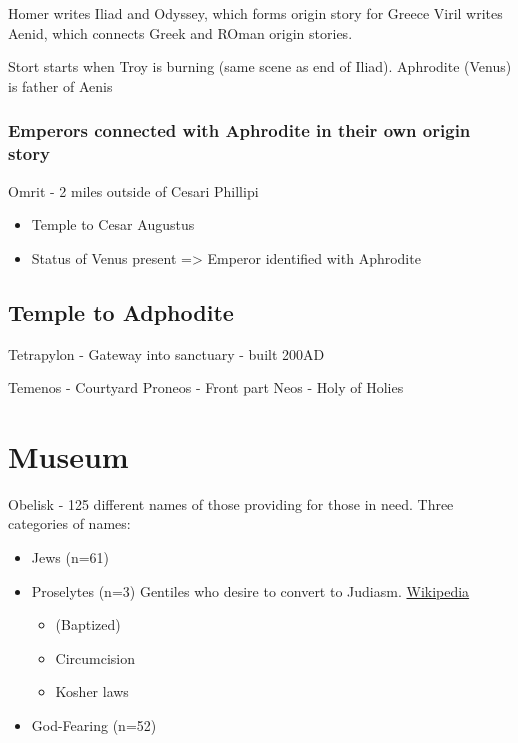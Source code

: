 \documentclass[
]{book}
\providecommand{\tightlist}{%
  \setlength{\itemsep}{0pt}\setlength{\parskip}{0pt}}
\begin{document}
Homer writes Iliad and Odyssey, which forms origin story for Greece
Viril writes Aenid, which connects Greek and ROman origin stories.

Stort starts when Troy is burning (same scene as end of Iliad).
Aphrodite (Venus) is father of Aenis

\hypertarget{emperors-connected-with-aphrodite-in-their-own-origin-story}{%
\subsection{Emperors connected with Aphrodite in their own origin story}\label{emperors-connected-with-aphrodite-in-their-own-origin-story}}

Omrit - 2 miles outside of Cesari Phillipi

\begin{itemize}
\tightlist
\item
  Temple to Cesar Augustus
\item
  Status of Venus present
  =\textgreater{} Emperor identified with Aphrodite
\end{itemize}

\hypertarget{temple-to-adphodite}{%
\section{Temple to Adphodite}\label{temple-to-adphodite}}

Tetrapylon - Gateway into sanctuary - built 200AD

Temenos - Courtyard
Proneos - Front part
Neos - Holy of Holies

\hypertarget{museum}{%
\chapter{Museum}\label{museum}}

Obelisk - 125 different names of those providing for those in need.
Three categories of names:

\begin{itemize}
\item
  Jews (n=61)
\item
  Proselytes (n=3) Gentiles who desire to convert to Judiasm. \href{https://en.wikipedia.org/wiki/Proselyte}{Wikipedia}

  \begin{itemize}
  \tightlist
  \item
    (Baptized)
  \item
    Circumcision
  \item
    Kosher laws
  \end{itemize}
\item
  God-Fearing (n=52)
\end{itemize}
\end{document}
